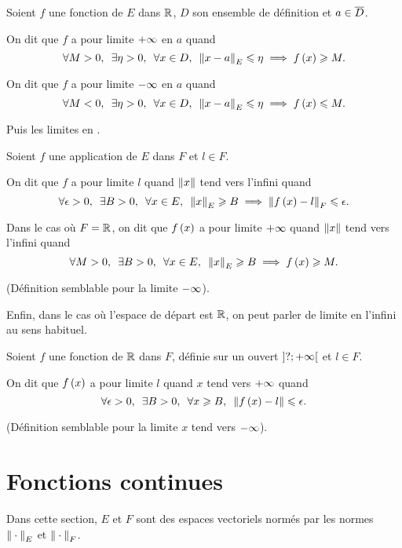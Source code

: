 \begin{defi}
Soient \(f\) une fonction de \(E\) dans \(\mathbb{R}\), \(D\) son ensemble de définition et \(a\in\overline{D}\).

On dit que \(f\) a pour limite \(+\infty\) en \(a\) quand \[\quantifs{\forall M>0;\exists\eta>0;\forall x\in D}\norme{x-a}_E\leq\eta\imp f\paren{x}\geq M.\]

On dit que \(f\) a pour limite \(-\infty\) en \(a\) quand \[\quantifs{\forall M<0;\exists\eta>0;\forall x\in D}\norme{x-a}_E\leq\eta\imp f\paren{x}\leq M.\]
\end{defi}

Puis les limites en .

\begin{defi}
Soient \(f\) une application de \(E\) dans \(F\) et \(l\in F\).

On dit que \(f\) a pour limite \(l\) quand \(\norme{x}\) tend vers l'infini quand \[\quantifs{\forall\epsilon>0;\exists B>0;\forall x\in E}\norme{x}_E\geq B\imp\norme{f\paren{x}-l}_F\leq\epsilon.\]

Dans le cas où \(F=\mathbb{R}\), on dit que \(f\left(x\right)\) a pour limite \(+\infty\) quand \(\norme{x}\) tend vers l'infini quand \[\quantifs{\forall M>0;\exists B>0;\forall x\in E}\norme{x}_E\geq B\imp f\paren{x}\geq M.\]

(Définition semblable pour la limite \(-\infty\)).
\end{defi}

Enfin, dans le cas où l'espace de départ est \(\mathbb{R}\), on peut parler de limite en l'infini au sens habituel.

\begin{defi}
Soient \(f\) une fonction de \(\mathbb{R}\) dans \(F\), définie sur un ouvert \(\left]?;+\infty\right[\) et \(l\in F\).

On dit que \(f\left(x\right)\) a pour limite \(l\) quand \(x\) tend vers \(+\infty\) quand \[\quantifs{\forall\epsilon>0;\exists B>0;\forall x\geq B}\norme{f\paren{x}-l}\leq\epsilon.\]

(Définition semblable pour la limite \(x\) tend vers \(-\infty\)).
\end{defi}

\section{Fonctions continues}

Dans cette section, \(E\) et \(F\) sont des espaces vectoriels normés par les normes \(\norme{}_E\) et \(\norme{}_F\).

